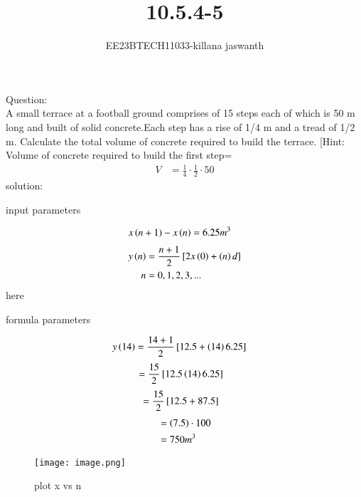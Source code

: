 \documentclass[journal,12pt,twocolumn]{IEEEtran}
\theoremstyle{remark}
\begin{document}

\vspace{3cm}

\title{10.5.4-5}
\author{EE23BTECH11033-killana jaswanth}
\maketitle
\newpage

\bigskip

\renewcommand{\thefigure}{\theenumi}
\renewcommand{\thetable}{\theenumi}
Question:\\
A small terrace at a football ground comprises of 15 steps each of which is 50
m long and built of solid concrete.Each step has a rise of 1/4 m and a tread of
1/2 m. Calculate the total volume of concrete required to build the terrace.
[Hint: Volume of concrete required to build the first step=\begin{align}
    V&=\frac{1}{4} \cdot \frac{1}{2} \cdot 50 
\end{align}
solution:
\begin{table}[!ht]
 \centering
  
   \caption{input parameters}
   \label{tab:10.5.4.5}
   \end{table}
\begin{align}
x\left(n+1\right)-x\left(n\right)&=6.25m^3
\end{align}
\begin{align}
y\left(n\right) &= \frac{n+1}{2} {}\left[2x\left(0\right)+\left(n\right)d\right]   
\\n&=0,1,2,3,...
\end{align}
here\\\begin{table}[!ht]
 \centering
  
   \caption{formula parameters}
   \label{tab:10.5.4.5}
   \end{table}
\begin{align}
y\left(14\right) &= \frac{14+1}{2} {}\left[12.5+\left(14\right)6.25\right]
\end{align}
\begin{align}
 &= \frac{15}{2}{}\left[12.5\left(14\right)6.25\right]
\end{align}
   \begin{align}
    &= \frac{15}{2} {}\left[12.5+87.5\right]
   \end{align}
   \begin{align}
   &=\left(7.5\right) \cdot 100
  \\ &=750m^3
   \end{align}
\begin{figure}[!ht]
    \centering
    \texttt{[image: image.png]}
    \caption{plot x vs n}
    \label{fig:enter-label}
\end{figure}
\end{document}
